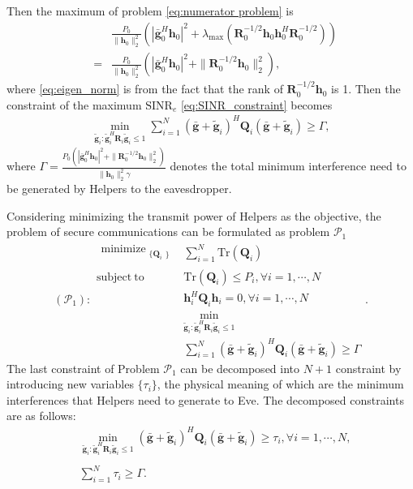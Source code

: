 \documentclass[conference]{IEEEtran}
\begin{document}
Then the maximum of problem \eqref{eq:numerator problem} is
\begin{eqnarray}
&&\frac{P_0}{\|\mathbf{h}_0\|_2^2}(|\bar{\mathbf{g}}_0^H\mathbf{h}_0|^2 + \lambda_{\mathrm{max}}(\mathbf{R}_0^{-1/2}\mathbf{h}_0\mathbf{h}_0^H\mathbf{R}_0^{-1/2}))\\
&=&\frac{P_0}{\|\mathbf{h}_0\|_2^2}(|\bar{\mathbf{g}}_0^H\mathbf{h}_0|^2 + \|\mathbf{R}_0^{-1/2}\mathbf{h}_0\|_2^2)\label{eq:eigen_norm},
\end{eqnarray} 
where \eqref{eq:eigen_norm} is from the fact that the rank of $\mathbf{R}_0^{-1/2}\mathbf{h}_0$ is 1. Then the constraint of the maximum $\mathrm{SINR}_e$ \eqref{eq:SINR_constraint}  becomes
\begin{eqnarray}
\min_{\tilde{\mathbf{g}}_i: \tilde{\mathbf{g}}_i^H \mathbf{R}_i\tilde{\mathbf{g}}_i \leq 1}\sum_{i=1}^{N}(\bar{\mathbf{g}}+\tilde{\mathbf{g}}_i)^H\mathbf{Q}_i(\bar{\mathbf{g}}+\tilde{\mathbf{g}}_i) \geq \Gamma  \label{eq:artificial noise constraint},
\end{eqnarray}
where $\Gamma =\frac{P_0\left(|\bar{\mathbf{g}}_0^H\mathbf{h}_0|^2 + \|\mathbf{R}_0^{-1/2}\mathbf{h}_0\|_2^2\right)}{\|\mathbf{h}_0\|_2^2\gamma}$ denotes the total minimum interference need to be generated by Helpers to the eavesdropper.

Considering minimizing the transmit power of Helpers as the objective, the problem of secure communications can be formulated as problem $\mathcal{P}_1$ 
\begin{equation}\label{eq:problem1}
(\mathcal{P}_{1}): \begin{array}{ll}
\begin{split}
\mathop{\text{minimize}}_{\substack{\{\mathbf{Q}_{i}}\}} 
\end{split}  
& \sum_{i = 1}^{N}\mathrm{Tr}(\mathbf{Q}_i)\\
\mathrm{subject~to} &\mathrm{Tr}(\mathbf{Q}_i) \leq P_i, \forall i = 1, \cdots, N\\
& \mathbf{h}_i^H \mathbf{Q}_i \mathbf{h}_i= 0, \forall i = 1,\cdots,N\\
&\min_{\tilde{\mathbf{g}}_i: \tilde{\mathbf{g}}_i^H \mathbf{R}_i\tilde{\mathbf{g}}_i \leq 1}\\
&\sum_{i=1}^{N}(\bar{\mathbf{g}}+\tilde{\mathbf{g}}_i)^H\mathbf{Q}_i(\bar{\mathbf{g}}+\tilde{\mathbf{g}}_i) \geq  \Gamma
\end{array}.
\end{equation}
The last constraint of Problem $\mathcal{P}_1$ can be decomposed into $N+1$ constraint by introducing new variables $\{\tau_i\}$, the physical meaning of which are the minimum interferences that Helpers need to generate to Eve. The decomposed constraints are as follows:
\begin{eqnarray}
&\min_{\tilde{\mathbf{g}}_i: \tilde{\mathbf{g}}_i^H \mathbf{R}_i\tilde{\mathbf{g}}_i \leq 1}(\bar{\mathbf{g}}+\tilde{\mathbf{g}}_i)^H\mathbf{Q}_i(\bar{\mathbf{g}}+\tilde{\mathbf{g}}_i) \geq  \tau_i, \forall i = 1,\cdots,N\label{eq:artificial noise constraint decomposed},\nonumber\\
\\
&\sum_{i =1}^{N}\tau_i \geq \Gamma.
\end{eqnarray}
 
\end{document}
